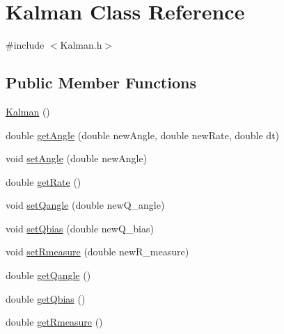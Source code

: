 \hypertarget{classKalman}{}\section{Kalman Class Reference}
\label{classKalman}


{\ttfamily \#include $<$Kalman.\+h$>$}

\subsection*{Public Member Functions}
\begin{DoxyCompactItemize}
\item 
\hyperlink{classKalman_a0b487a843716cd64125c1206370cf03c}{Kalman} ()
\item 
double \hyperlink{classKalman_a720bb38b4fa44cedebf7c4855d003bcc}{get\+Angle} (double new\+Angle, double new\+Rate, double dt)
\item 
void \hyperlink{classKalman_ae8a2a72ec8c607f46cffbaab5fcfd709}{set\+Angle} (double new\+Angle)
\item 
double \hyperlink{classKalman_ab4809aa70b7b7f1dfaa54b9ae76bec88}{get\+Rate} ()
\item 
void \hyperlink{classKalman_ab60764d397da6e7b7866b6aac75ed49b}{set\+Qangle} (double new\+Q\+\_\+angle)
\item 
void \hyperlink{classKalman_af6a4ddd9e434ae21775b164c36ec96b1}{set\+Qbias} (double new\+Q\+\_\+bias)
\item 
void \hyperlink{classKalman_a2c5f903b6b5c3363011a99fc67c7eca4}{set\+Rmeasure} (double new\+R\+\_\+measure)
\item 
double \hyperlink{classKalman_a6f6ebe93d38c7ed5cd4c52b10058d492}{get\+Qangle} ()
\item 
double \hyperlink{classKalman_a85dbaf1f6c52963617feec27614d717a}{get\+Qbias} ()
\item 
double \hyperlink{classKalman_abb2619fece12565633090130d83ec1b5}{get\+Rmeasure} ()
\end{DoxyCompactItemize}
